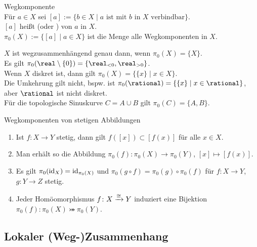 \begin{Def}{Wegkomponente}\\
    Für $a \in X$ sei
    $[a] := \{b \in X \;|\; a \text{ ist mit } b \text{ in }
    X \text{ verbindbar}\}$. \\
    $[a]$ heißt 
    (oder ) von $a$ in $X$. \\
    $\pi_0(X) := \{[a] \;|\; a \in X\}$ ist die Menge alle Wegkomponenten
    in $X$.
\end{Def}

\begin{Bsp}
    $X$ ist wegzusammenhängend genau dann, wenn $\pi_0(X) = \{X\}$. \\
    Es gilt $\pi_0(\real \setminus \{0\}) = \{\real_{<0}, \real_{>0}\}$. \\
    Wenn $X$ diskret ist, dann gilt $\pi_0(X) = \{\{x\} \;|\; x \in X\}$. \\
    Die Umkehrung gilt nicht, bspw. ist
    $\pi_0(\rational) = \{\{x\} \;|\; x \in \rational\}$,
    aber $\rational$ ist nicht diskret. \\
    Für die topologische Sinuskurve $C = A \cup B$ gilt $\pi_0(C) = \{A, B\}$.
\end{Bsp}

\begin{Satz}{Wegkomponenten von stetigen Abbildungen}
    \begin{enumerate}
        \item
        Ist $f\colon X \rightarrow Y$ stetig, dann gilt
        $f([x]) \subset [f(x)]$ für alle $x \in X$.

        \item
        Man erhält so die Abbildung
        $\pi_0(f)\colon \pi_0(X) \rightarrow \pi_0(Y)$,
        $[x] \mapsto [f(x)]$.

        \item
        Es gilt $\pi_0(\operatorname{id}_X) = \operatorname{id}_{\pi_0(X)}$ und
        $\pi_0(g \circ f) = \pi_0(g) \circ \pi_0(f)$ für
        $f\colon X \rightarrow Y$, $g\colon Y \rightarrow Z$ stetig.

        \item
        Jeder Homöomorphismus $f\colon X \xrightarrow{\cong} Y$ induziert eine Bijektion
        $\pi_0(f)\colon \pi_0(X) \bij \pi_0(Y)$.
    \end{enumerate}
\end{Satz}

\subsection{%
    Lokaler (Weg-)Zusammenhang%
}

